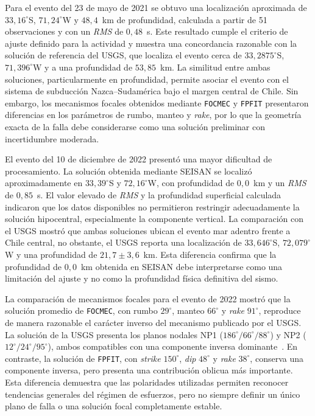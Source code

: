 \documentclass[a4paper,12pt]{article} %
\numberwithin{equation}{section} %
\numberwithin{figure}{section} %
\begin{document}
Para el evento del 23 de mayo de 2021 se obtuvo una localización aproximada de $33{,}16^\circ$S, $71{,}24^\circ$W y $48{,}4$~km de profundidad, calculada a partir de 51 observaciones y con un \textit{RMS} de $0{,}48$~s. Este resultado cumple el criterio de ajuste definido para la actividad y muestra una concordancia razonable con la solución de referencia del USGS, que localiza el evento cerca de $33{,}2875^\circ$S, $71{,}396^\circ$W y a una profundidad de $53{,}85$~km.\cite{USGS2021Quilpue} La similitud entre ambas soluciones, particularmente en profundidad, permite asociar el evento con el sistema de subducción Nazca--Sudamérica bajo el margen central de Chile. Sin embargo, los mecanismos focales obtenidos mediante \texttt{FOCMEC} y \texttt{FPFIT} presentaron diferencias en los parámetros de rumbo, manteo y \textit{rake}, por lo que la geometría exacta de la falla debe considerarse como una solución preliminar con incertidumbre moderada.

El evento del 10 de diciembre de 2022 presentó una mayor dificultad de procesamiento. La solución obtenida mediante SEISAN se localizó aproximadamente en $33{,}39^\circ$S y $72{,}16^\circ$W, con profundidad de $0{,}0$~km y un \textit{RMS} de $0{,}85$~s. El valor elevado de \textit{RMS} y la profundidad superficial calculada indicaron que los datos disponibles no permitieron restringir adecuadamente la solución hipocentral, especialmente la componente vertical. La comparación con el USGS mostró que ambas soluciones ubican el evento mar adentro frente a Chile central, no obstante, el USGS reporta una localización de $33{,}646^\circ$S, $72{,}079^\circ$W y una profundidad de $21{,}7 \pm 3{,}6$~km.\cite{USGS2022OffshoreChile} Esta diferencia confirma que la profundidad de $0{,}0$~km obtenida en SEISAN debe interpretarse como una limitación del ajuste y no como la profundidad física definitiva del sismo.

La comparación de mecanismos focales para el evento de 2022 mostró que la solución promedio de \texttt{FOCMEC}, con rumbo $29^\circ$, manteo $66^\circ$ y \textit{rake} $91^\circ$, reproduce de manera razonable el carácter inverso del mecanismo publicado por el USGS. La solución de la USGS presenta los planos nodales NP1 ($186^\circ/66^\circ/88^\circ$) y NP2 ($12^\circ/24^\circ/95^\circ$), ambos compatibles con una componente inversa dominante~\cite{USGS2022OffshoreChile}. En contraste, la solución de \texttt{FPFIT}, con \textit{strike} $150^\circ$, \textit{dip} $48^\circ$ y \textit{rake} $38^\circ$, conserva una componente inversa, pero presenta una contribución oblicua más importante. Esta diferencia demuestra que las polaridades utilizadas permiten reconocer tendencias generales del régimen de esfuerzos, pero no siempre definir un único plano de falla o una solución focal completamente estable.
\end{document}
